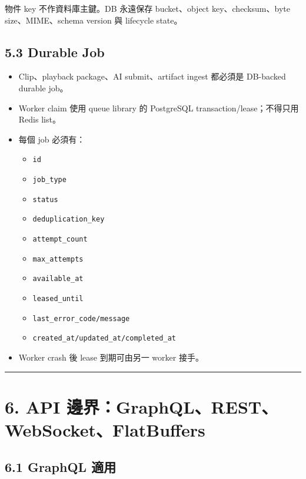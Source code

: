 \documentclass[
  9pt,
  a4paper,
]{article}
\providecommand{\tightlist}{%
  \setlength{\itemsep}{0pt}\setlength{\parskip}{0pt}}
\begin{document}
物件 key 不作資料庫主鍵。DB 永遠保存 bucket、object key、checksum、byte
size、MIME、schema version 與 lifecycle state。

\subsection{5.3 Durable Job}\label{53-durable-job}

\begin{itemize}
\tightlist
\item
  Clip、playback package、AI submit、artifact ingest 都必須是 DB-backed
  durable job。
\item
  Worker claim 使用 queue library 的 PostgreSQL
  transaction/lease；不得只用 Redis list。
\item
  每個 job 必須有：

  \begin{itemize}
  \tightlist
  \item
    \texttt{id}
  \item
    \texttt{job\_\allowbreak{}type}
  \item
    \texttt{status}
  \item
    \texttt{deduplication\_\allowbreak{}key}
  \item
    \texttt{attempt\_\allowbreak{}count}
  \item
    \texttt{max\_\allowbreak{}attempts}
  \item
    \texttt{available\_\allowbreak{}at}
  \item
    \texttt{leased\_\allowbreak{}until}
  \item
    \texttt{last\_\allowbreak{}error\_\allowbreak{}code/message}
  \item
    \texttt{created\_\allowbreak{}at/updated\_\allowbreak{}at/completed\_\allowbreak{}at}
  \end{itemize}
\item
  Worker crash 後 lease 到期可由另一 worker 接手。
\end{itemize}

\begin{center}\rule{0.5\linewidth}{0.5pt}\end{center}

\section{6. API
邊界：GraphQL、REST、WebSocket、FlatBuffers}\label{6-api-ux908aux754cgraphqlrestwebsocketflatbuffers}

\subsection{6.1 GraphQL 適用}\label{61-graphql-ux9069ux7528}
\end{document}
